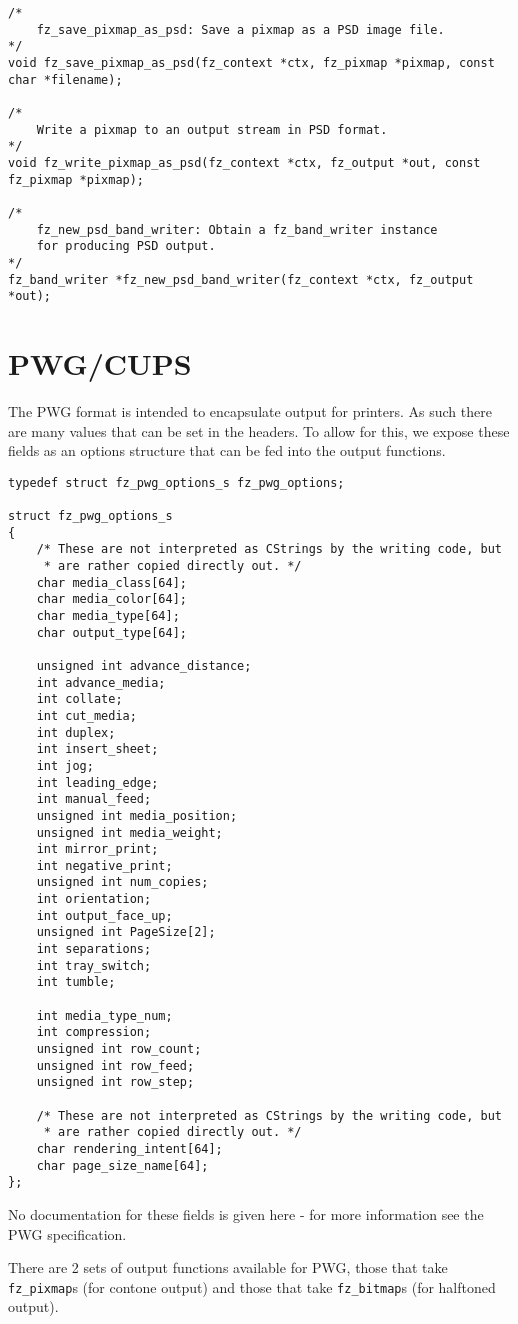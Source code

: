 \documentclass[oneside]{book}
\begin{document}
\begin{lstlisting}
/*
	fz_save_pixmap_as_psd: Save a pixmap as a PSD image file.
*/
void fz_save_pixmap_as_psd(fz_context *ctx, fz_pixmap *pixmap, const char *filename);

/*
	Write a pixmap to an output stream in PSD format.
*/
void fz_write_pixmap_as_psd(fz_context *ctx, fz_output *out, const fz_pixmap *pixmap);

/*
	fz_new_psd_band_writer: Obtain a fz_band_writer instance
	for producing PSD output.
*/
fz_band_writer *fz_new_psd_band_writer(fz_context *ctx, fz_output *out);
\end{lstlisting}

\section{PWG/CUPS}

The PWG format is intended to encapsulate output for printers. As such there are many values that can be set in the headers. To allow for this, we expose these fields as an options structure that can be fed into the output functions.

\begin{lstlisting}
typedef struct fz_pwg_options_s fz_pwg_options;

struct fz_pwg_options_s
{
	/* These are not interpreted as CStrings by the writing code, but
	 * are rather copied directly out. */
	char media_class[64];
	char media_color[64];
	char media_type[64];
	char output_type[64];

	unsigned int advance_distance;
	int advance_media;
	int collate;
	int cut_media;
	int duplex;
	int insert_sheet;
	int jog;
	int leading_edge;
	int manual_feed;
	unsigned int media_position;
	unsigned int media_weight;
	int mirror_print;
	int negative_print;
	unsigned int num_copies;
	int orientation;
	int output_face_up;
	unsigned int PageSize[2];
	int separations;
	int tray_switch;
	int tumble;

	int media_type_num;
	int compression;
	unsigned int row_count;
	unsigned int row_feed;
	unsigned int row_step;

	/* These are not interpreted as CStrings by the writing code, but
	 * are rather copied directly out. */
	char rendering_intent[64];
	char page_size_name[64];
};
\end{lstlisting}

No documentation for these fields is given here - for more information see the PWG specification.

There are 2 sets of output functions available for PWG, those that take \texttt{fz\_pixmap}s (for contone output) and those that take \texttt{fz\_bitmap}s (for halftoned output).
\end{document}
